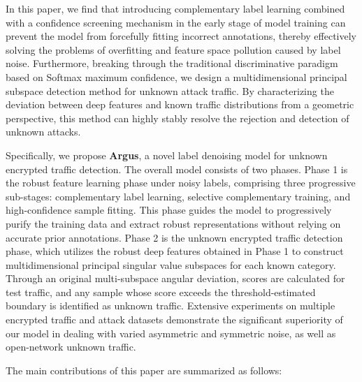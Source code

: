 \documentclass{SCIS2026}
\begin{document}
In this paper, we find that introducing complementary label learning combined with a confidence screening mechanism in the early stage of model training can prevent the model from forcefully fitting incorrect annotations, thereby effectively solving the problems of overfitting and feature space pollution caused by label noise. Furthermore, breaking through the traditional discriminative paradigm based on Softmax maximum confidence, we design a multidimensional principal subspace detection method for unknown attack traffic. By characterizing the deviation between deep features and known traffic distributions from a geometric perspective, this method can highly stably resolve the rejection and detection of unknown attacks.

Specifically, we propose \textbf{Argus}, a novel label denoising model for unknown encrypted traffic detection. The overall model consists of two phases. Phase 1 is the robust feature learning phase under noisy labels, comprising three progressive sub-stages: complementary label learning, selective complementary training, and high-confidence sample fitting. This phase guides the model to progressively purify the training data and extract robust representations without relying on accurate prior annotations. Phase 2 is the unknown encrypted traffic detection phase, which utilizes the robust deep features obtained in Phase 1 to construct multidimensional principal singular value subspaces for each known category. Through an original multi-subspace angular deviation, scores are calculated for test traffic, and any sample whose score exceeds the threshold-estimated boundary is identified as unknown traffic. Extensive experiments on multiple encrypted traffic and attack datasets demonstrate the significant superiority of our model in dealing with varied asymmetric and symmetric noise, as well as open-network unknown traffic.


The main contributions of this paper are summarized as follows:
\end{document}
